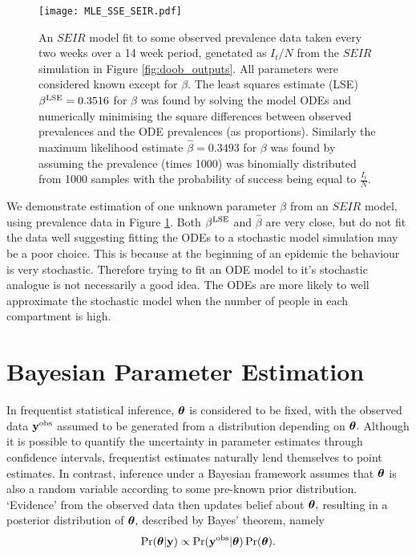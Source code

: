 \begin{figure}[htbp]
    \centering
    \texttt{[image: MLE\_SSE\_SEIR.pdf]}
    \caption{
        An $SEIR$ model fit to some observed prevalence data taken every two
        weeks over a 14 week period, genetated as $I_t/N$ from the $SEIR$
        simulation in Figure \ref{fig:doob_outputs}.
        All parameters were considered known except for $\beta$.
        The least squares estimate (LSE) $\beta^{\mathrm{LSE}} = 0.3516$
        for $\beta$
        was found by solving the model ODEs and numerically minimising the
        square differences between observed prevalences and the ODE prevalences
        (as proportions). Similarly the maximum likelihood estimate
        $\hat{\beta} = 0.3493$ for $\beta$
        was found by assuming the prevalence (times 1000) was binomially
        distributed from 1000 samples with the probability of success being
        equal to $\frac{I_t}{N}.$
    }
    \label{fig:MLE_SSE}
\end{figure}

We demonstrate estimation of one unknown parameter $\beta$ from an $SEIR$ model,
using prevalence data in Figure
\ref{fig:MLE_SSE}. Both $\beta^{\mathrm{LSE}}$ and $\hat{\beta}$ are very close, but do
not fit the data well suggesting fitting the ODEs to a stochastic model
simulation may be a poor choice. This is because at the beginning of an
epidemic the behaviour is very stochastic. Therefore trying to fit an ODE model
to it's stochastic analogue is not necessarily a good idea. The ODEs are more
likely to well approximate the stochastic model when the number of people in
each compartment is high.

\section{Bayesian Parameter Estimation}

In frequentist statistical inference, $\bm{\theta}$ is considered to be
fixed, with the observed data $\mathbf{y}^{\mathrm{obs}}$ assumed to be
generated from a distribution depending on $\bm{\theta}.$ Although it is possible
to quantify the uncertainty in parameter estimates through confidence intervals,
frequentist estimates naturally lend themselves to point estimates.
In contrast, inference under a Bayesian
framework assumes that $\bm{\theta}$ is also a random variable according to some
pre-known prior distribution. `Evidence' from the observed data then updates
belief about
$\bm{\theta},$ resulting in a posterior distribution of $\bm{\theta},$ described by
Bayes' theorem, namely
$$
    \Pr(\bm{\theta}|\mathbf{y}) \propto \Pr(\mathbf{y}^{\mathrm{obs}}|\bm{\theta})\Pr(\bm{\theta}).
$$

